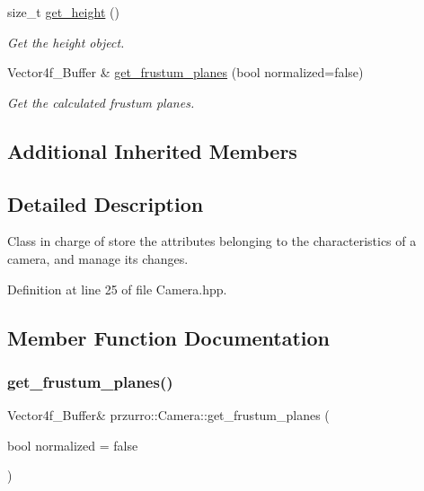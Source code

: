 \begin{DoxyCompactItemize}
size\+\_\+t \mbox{\hyperlink{classprzurro_1_1_camera_a53ed7c30a4f622b7c680c4d2bbc117d4}{get\+\_\+height}} ()
\begin{DoxyCompactList}\small\item\em Get the height object. \end{DoxyCompactList}\item 
Vector4f\+\_\+\+Buffer \& \mbox{\hyperlink{classprzurro_1_1_camera_a6c95cd160d41adea4b7b706e387a9001}{get\+\_\+frustum\+\_\+planes}} (bool normalized=false)
\begin{DoxyCompactList}\small\item\em Get the calculated frustum planes. \end{DoxyCompactList}\end{DoxyCompactItemize}
\subsection*{Additional Inherited Members}


\subsection{Detailed Description}
Class in charge of store the attributes belonging to the characteristics of a camera, and manage it\textquotesingle{}s changes. 



Definition at line 25 of file Camera.\+hpp.



\subsection{Member Function Documentation}
\mbox{\label{classprzurro_1_1_camera_a6c95cd160d41adea4b7b706e387a9001}} 
\subsubsection{\texorpdfstring{get\_frustum\_planes()}{get\_frustum\_planes()}}
{\footnotesize\ttfamily Vector4f\+\_\+\+Buffer\& przurro\+::\+Camera\+::get\+\_\+frustum\+\_\+planes (\begin{DoxyParamCaption}\item[{bool}]{normalized = {\ttfamily false} }\end{DoxyParamCaption})\hspace{0.3cm}{\ttfamily [inline]}}



